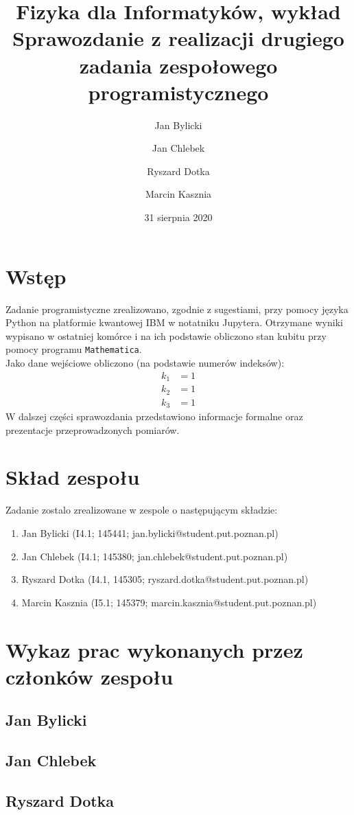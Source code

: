 \documentclass{article}
\title{Fizyka dla Informatyków, wykład\\ Sprawozdanie z realizacji drugiego zadania zespołowego programistycznego}
\author{Jan Bylicki \and Jan Chlebek \and Ryszard Dotka \and Marcin Kasznia}
\date{31 sierpnia 2020}
\begin{document}
\maketitle

\section{Wstęp}
Zadanie programistyczne zrealizowano, zgodnie z sugestiami, przy pomocy języka Python na platformie kwantowej IBM w notatniku Jupytera. Otrzymane wyniki wypisano w ostatniej komórce i na ich podstawie obliczono stan kubitu przy pomocy programu \verb+Mathematica+.\\
Jako dane wejściowe obliczono (na podstawie numerów indeksów):
\begin{align*}
    k_1&=1\\
    k_2&=1\\
    k_3&=1
\end{align*}
W dalszej części sprawozdania przedstawiono informacje formalne oraz prezentacje przeprowadzonych pomiarów.

\section{Skład zespołu}
Zadanie zostalo zrealizowane w zespole o następującym składzie:
\begin{enumerate}
    \item Jan Bylicki (I4.1; 145441; jan.bylicki@student.put.poznan.pl)
    \item Jan Chlebek (I4.1; 145380; jan.chlebek@student.put.poznan.pl)
    \item Ryszard Dotka (I4.1, 145305; ryszard.dotka@student.put.poznan.pl)
    \item Marcin Kasznia (I5.1; 145379; marcin.kasznia@student.put.poznan.pl)
\end{enumerate}

\section{Wykaz prac wykonanych przez członków zespołu}
    \subsection{Jan Bylicki}
    \subsection{Jan Chlebek}
    \subsection{Ryszard Dotka}
\end{document}
